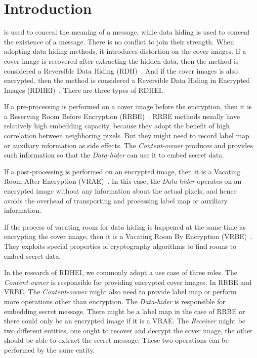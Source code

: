 \documentclass[journal]{IEEEtran}
\begin{document}
	\section{Introduction}
	\label{sec:intro}
	
	is used to conceal the meaning of a message, while data hiding is used to conceal the existence of a message.
	There is no conflict to join their strength.
	When adopting data hiding methods, it introduces distortion on the cover images. 
	If a cover image is recovered after extracting the hidden data, then the method is considered a Reversible Data Hiding (RDH)~\cite{Coatrieux2009, Gao2009, Li2020}.
	And if the cover images is also encrypted, then the method is considered a Reversible Data Hiding in Encrypted Images (RDHEI)~\cite{Zhang2011, Liu2020, Jain2021, Di2018}.
	There are three types of RDHEI.
	
	If a pre-processing is performed on a cover image before the encryption, then it is a Reserving Room Before Encryption (RRBE)~\cite{Ma2013, Agrawal2017, Liao2015}.
	RRBE methods usually have relatively high embedding capacity, because they adopt the benefit of high correlation between neighboring pixels. 
	But they might need to record label map or auxiliary information as side effects. 
	The \emph{Content-owner} produces and provides such information so that the \emph{Data-hider} can use it to embed secret data.
	
	If a post-processing is performed on an encrypted image, then it is a Vacating Room After Encryption (VRAE)~\cite{Puech2008, Wu2019, Li2018}. 
	In this case, the \emph{Data-hider} operates on an encrypted image without any information about the actual pixels, and hence avoids the overhead of transporting and processing label map or auxiliary information.

	If the process of vacating room for data hiding is happened at the same time as encrypting the cover image, then it is a Vacating Room By Encryption (VRBE)~\cite{Liu2018, Yu2020}. 
	They exploits special properties of cryptography algorithms to find rooms to embed secret data. 

	In the research of RDHEI, we commonly adopt a use case of three roles. 
	The \emph{Content-owner} is responsible for providing encrypted cover images. 
	In RRBE and VRBE, The \emph{Content-owner} might also need to provide label map or perform more operations other than encryption.
	The \emph{Data-hider} is responsible for embedding secret message. 
	There might be a label map in the case of RRBE or there could only be an encrypted image if it is a VRAE.
	The \emph{Receiver} might be two different entities, one ought to recover and decrypt the cover image, the other should be able to extract the secret message. 
	These two operations can be performed by the same entity.
	
\end{document}

